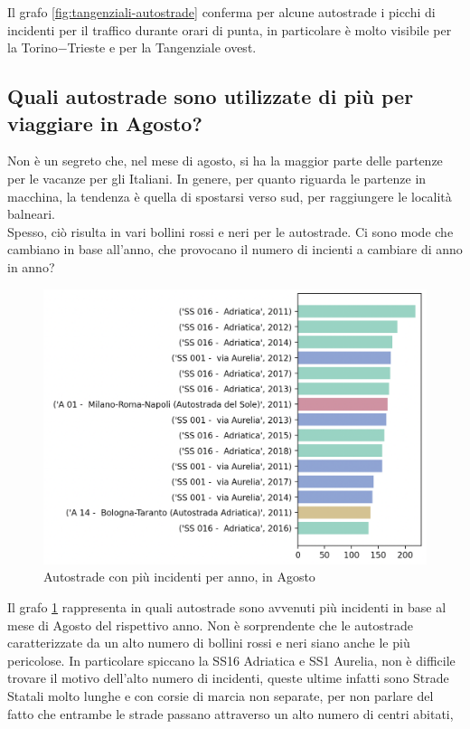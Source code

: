 \documentclass[a4paper]{report}
\begin{document}
Il grafo \ref{fig:tangenziali-autostrade} conferma per alcune autostrade i picchi di 
incidenti per il traffico durante orari di punta, 
in particolare è molto visibile per la Torino$-$Trieste e per la Tangenziale ovest.

\subsection{Quali autostrade sono utilizzate di più per viaggiare in Agosto?}

Non è un segreto che, nel mese di agosto, si ha la maggior parte delle partenze per le vacanze per 
gli Italiani. In genere, per quanto riguarda le partenze in macchina, la tendenza è quella di spostarsi verso sud, 
per raggiungere le località balneari.\\
Spesso, ciò risulta in vari bollini rossi e neri per le autostrade. 
Ci sono mode che cambiano in base all'anno, 
che provocano il numero di incienti a cambiare di anno in anno? 

\begin{figure}
    \includegraphics[width=\linewidth]{../src/incidenti/incidenti_aci/agosto/autostrade_anno_agosto.png}
    \caption{Autostrade con più incidenti per anno, in Agosto}
    \label{fig:autostrade-anno-agosto}
\end{figure}

Il grafo \ref{fig:autostrade-anno-agosto} rappresenta in quali autostrade sono avvenuti 
più incidenti in base al mese di Agosto del rispettivo anno.
Non è sorprendente che le autostrade caratterizzate da un alto numero di bollini rossi e neri 
siano anche le più pericolose.
In particolare spiccano la SS16 Adriatica e SS1 Aurelia, non è difficile trovare il motivo 
dell'alto numero di incidenti, 
queste ultime infatti sono Strade Statali molto lunghe e con corsie di marcia non separate, 
per non parlare del fatto che entrambe le strade passano attraverso un alto numero di centri abitati, 
\end{document}
